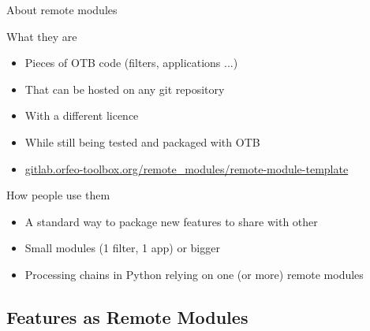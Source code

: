 \documentclass[8pt]{beamer}
\begin{document}
\begin{frame}{About remote modules}
\begin{block}{What they are}
  \begin{itemize}
    \item Pieces of OTB code (filters, applications ...)
    \item That can be hosted on any git repository
    \item With a different licence
    \item While still being tested and packaged with OTB
    \item \url{gitlab.orfeo-toolbox.org/remote_modules/remote-module-template}
  \end{itemize}
\end{block}

\begin{block}{How people use them}
  \begin{itemize}
    \item A standard way to package new features to share with other
    \item Small modules (1 filter, 1 app) or bigger
    \item Processing chains in Python relying on one (or more) remote modules
    \end{itemize}
\end{block}  
\end{frame}

\subsection{Features as Remote Modules}
\end{document}
